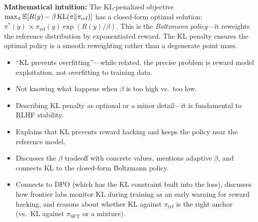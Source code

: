 \begin{interviewq}
\textbf{Mathematical intuition:} The KL-penalized objective $\max_\pi \operatorname{\mathbb{E}}[R(y) - \beta \operatorname{KL}(\pi \| \pi_{\text{ref}})]$ has a closed-form optimal solution: $\pi^*(y) \propto \pi_{\text{ref}}(y) \exp(R(y)/\beta)$. This is the \textit{Boltzmann policy}---it reweights the reference distribution by exponentiated reward. The KL penalty ensures the optimal policy is a smooth reweighting rather than a degenerate point mass.

\redflags
\begin{itemize}
    \item ``KL prevents overfitting''---while related, the precise problem is reward model exploitation, not overfitting to training data.
    \item Not knowing what happens when $\beta$ is too high vs.\ too low.
    \item Describing KL penalty as optional or a minor detail---it is fundamental to RLHF stability.
\end{itemize}


\goodgreat
\begin{itemize}
    \item {} Explains that KL prevents reward hacking and keeps the policy near the reference model.
    \item {} Discusses the $\beta$ tradeoff with concrete values, mentions adaptive $\beta$, and connects KL to the closed-form Boltzmann policy.
    \item {} Connects to DPO (which has the KL constraint built into the loss), discusses how frontier labs monitor KL during training as an early warning for reward hacking, and reasons about whether KL against $\pi_{\text{ref}}$ is the right anchor (vs.\ KL against $\pi_{\text{SFT}}$ or a mixture).
\end{itemize}

\end{interviewq}


